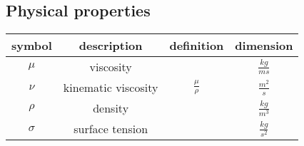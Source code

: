 \documentclass{report}
\begin{document}
\subsection{Physical properties}

\begin{center}
  \begin{tabular*}{0.75\textwidth}{@{\extracolsep{\fill}}|cccc|} 
    \hline
         symbol    & description          & definition               & dimension         \\
    \hline
    \hline
         $\mu$     & viscosity            &                          & $\frac{kg}{ms} $  \\
    \hline
         $\nu$     & kinematic viscosity  & $\frac{\mu}{\rho}$       & $\frac{m^2}{s} $  \\
    \hline
         $\rho$    & density              &                          & $\frac{kg}{m^3}$  \\
    \hline
         $\sigma$  & surface tension      &                          & $\frac{kg}{s^2}$  \\
    \hline
  \end{tabular*}
\end{center}
\end{document}
